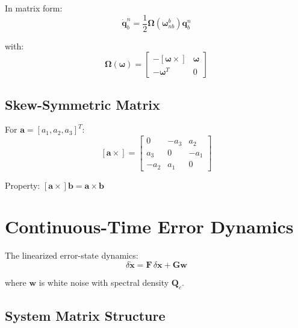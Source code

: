\documentclass[11pt,a4paper]{article}
\newcommand{\mat}[1]{\mathbf{#1}}
\newcommand{\vect}[1]{\boldsymbol{#1}}
\newcommand{\quat}[1]{\mathbf{#1}}
\newcommand{\skewmat}[1]{\left[#1 \times\right]}
\begin{document}
In matrix form:
\begin{equation}
    \dot{\quat{q}}_b^n = \frac{1}{2} \mat{\Omega}(\vect{\omega}_{nb}^b) \quat{q}_b^n
\end{equation}

with:
\begin{equation}
    \mat{\Omega}(\vect{\omega}) = \begin{bmatrix}
        -\skewmat{\vect{\omega}} & \vect{\omega} \\
        -\vect{\omega}^T & 0
    \end{bmatrix}
\end{equation}

\subsection{Skew-Symmetric Matrix}

For $\vect{a} = [a_1, a_2, a_3]^T$:
\begin{equation}
    \skewmat{\vect{a}} = \begin{bmatrix}
        0 & -a_3 & a_2 \\
        a_3 & 0 & -a_1 \\
        -a_2 & a_1 & 0
    \end{bmatrix}
\end{equation}

Property: $\skewmat{\vect{a}}\vect{b} = \vect{a} \times \vect{b}$

\section{Continuous-Time Error Dynamics}

The linearized error-state dynamics:
\begin{equation}
    \delta\dot{\mat{x}} = \mat{F}\,\delta\mat{x} + \mat{G}\mat{w}
    \label{eq:error_dynamics}
\end{equation}

where $\mat{w}$ is white noise with spectral density $\mat{Q}_c$.

\subsection{System Matrix Structure}
\end{document}
